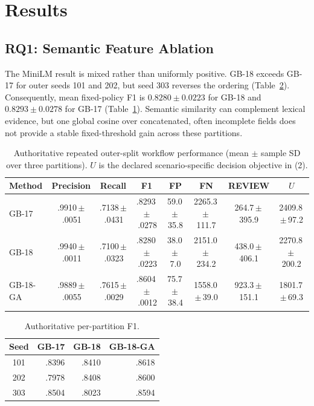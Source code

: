 \documentclass[conference]{IEEEtran}
\newcommand{\pmv}{\,$\pm$\,}
\begin{document}
\section{Results}
\subsection{RQ1: Semantic Feature Ablation}
The MiniLM result is mixed rather than uniformly positive. GB-18 exceeds GB-17 for outer seeds 101 and 202, but seed 303 reverses the ordering (Table~\ref{tab:outer}). Consequently, mean fixed-policy F1 is $0.8280\pm0.0223$ for GB-18 and $0.8293\pm0.0278$ for GB-17 (Table~\ref{tab:performance}). Semantic similarity can complement lexical evidence, but one global cosine over concatenated, often incomplete fields does not provide a stable fixed-threshold gain across these partitions.

\begin{table}[t]
\caption{Authoritative repeated outer-split workflow performance (mean $\pm$ sample SD over three partitions). $U$ is the declared scenario-specific decision objective in (2).}
\label{tab:performance}
\centering
\begin{tabular}{@{}lccccccc@{}}
\toprule
Method & Precision & Recall & F1 & FP & FN & REVIEW & $U$\\
\midrule
GB-17 & .9910\pmv.0051 & .7138\pmv.0431 & .8293\pmv.0278 & 59.0\pmv35.8 & 2265.3\pmv111.7 & 264.7\pmv395.9 & 2409.8\pmv97.2\\
GB-18 & .9940\pmv.0011 & .7100\pmv.0323 & .8280\pmv.0223 & 38.0\pmv7.0 & 2151.0\pmv234.2 & 438.0\pmv406.1 & 2270.8\pmv200.2\\
GB-18-GA & .9889\pmv.0055 & .7615\pmv.0029 & .8604\pmv.0012 & 75.7\pmv38.4 & 1558.0\pmv39.0 & 923.3\pmv151.1 & 1801.7\pmv69.3\\
\bottomrule
\end{tabular}
\end{table}

\begin{table}[t]
\caption{Authoritative per-partition F1.}
\label{tab:outer}
\centering
\begin{tabular}{@{}crrr@{}}
\toprule
Seed & GB-17 & GB-18 & GB-18-GA\\
\midrule
101 & .8396 & .8410 & .8618\\
202 & .7978 & .8408 & .8600\\
303 & .8504 & .8023 & .8594\\
\bottomrule
\end{tabular}
\end{table}
\end{document}
